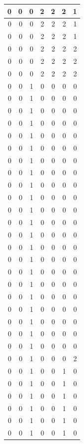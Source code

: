\documentclass[
  12pt,
]{krantz}
\begin{document}
\begin{tabular}{r|r|r|r|r|r|r}
\hline
0 & 0 & 0 & 2 & 2 & 2 & 1\\
\hline
0 & 0 & 0 & 2 & 2 & 2 & 1\\
\hline
0 & 0 & 0 & 2 & 2 & 2 & 1\\
\hline
0 & 0 & 0 & 2 & 2 & 2 & 2\\
\hline
0 & 0 & 0 & 2 & 2 & 2 & 2\\
\hline
0 & 0 & 0 & 2 & 2 & 2 & 2\\
\hline
0 & 0 & 1 & 0 & 0 & 0 & 0\\
\hline
0 & 0 & 1 & 0 & 0 & 0 & 0\\
\hline
0 & 0 & 1 & 0 & 0 & 0 & 0\\
\hline
0 & 0 & 1 & 0 & 0 & 0 & 0\\
\hline
0 & 0 & 1 & 0 & 0 & 0 & 0\\
\hline
0 & 0 & 1 & 0 & 0 & 0 & 0\\
\hline
0 & 0 & 1 & 0 & 0 & 0 & 0\\
\hline
0 & 0 & 1 & 0 & 0 & 0 & 0\\
\hline
0 & 0 & 1 & 0 & 0 & 0 & 0\\
\hline
0 & 0 & 1 & 0 & 0 & 0 & 0\\
\hline
0 & 0 & 1 & 0 & 0 & 0 & 0\\
\hline
0 & 0 & 1 & 0 & 0 & 0 & 0\\
\hline
0 & 0 & 1 & 0 & 0 & 0 & 0\\
\hline
0 & 0 & 1 & 0 & 0 & 0 & 0\\
\hline
0 & 0 & 1 & 0 & 0 & 0 & 0\\
\hline
0 & 0 & 1 & 0 & 0 & 0 & 0\\
\hline
0 & 0 & 1 & 0 & 0 & 0 & 0\\
\hline
0 & 0 & 1 & 0 & 0 & 0 & 0\\
\hline
0 & 0 & 1 & 0 & 0 & 0 & 0\\
\hline
0 & 0 & 1 & 0 & 0 & 0 & 0\\
\hline
0 & 0 & 1 & 0 & 0 & 0 & 0\\
\hline
0 & 0 & 1 & 0 & 0 & 0 & 0\\
\hline
0 & 0 & 1 & 0 & 0 & 0 & 2\\
\hline
0 & 0 & 1 & 0 & 0 & 1 & 0\\
\hline
0 & 0 & 1 & 0 & 0 & 1 & 0\\
\hline
0 & 0 & 1 & 0 & 0 & 1 & 0\\
\hline
0 & 0 & 1 & 0 & 0 & 1 & 0\\
\hline
0 & 0 & 1 & 0 & 0 & 1 & 0\\
\hline
0 & 0 & 1 & 0 & 0 & 1 & 0\\

\end{tabular}
\end{document}
